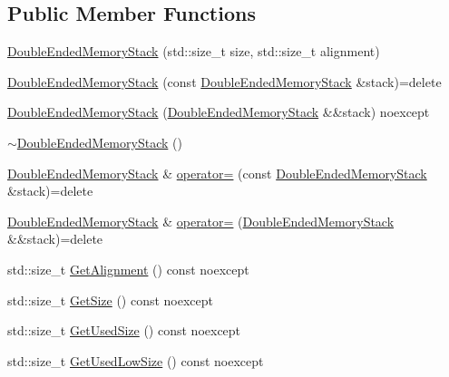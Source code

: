 \subsection*{Public Member Functions}
\begin{DoxyCompactItemize}
\item 
\mbox{\hyperlink{classmage_1_1_double_ended_memory_stack_a6523e21851c5a87e486d342d5e3b64d8}{Double\+Ended\+Memory\+Stack}} (std\+::size\+\_\+t size, std\+::size\+\_\+t alignment)
\item 
\mbox{\hyperlink{classmage_1_1_double_ended_memory_stack_a8a903d4a209929854a6f50cf98e3e2da}{Double\+Ended\+Memory\+Stack}} (const \mbox{\hyperlink{classmage_1_1_double_ended_memory_stack}{Double\+Ended\+Memory\+Stack}} \&stack)=delete
\item 
\mbox{\hyperlink{classmage_1_1_double_ended_memory_stack_a89d83095cc04686b9775fc4a55a5ff30}{Double\+Ended\+Memory\+Stack}} (\mbox{\hyperlink{classmage_1_1_double_ended_memory_stack}{Double\+Ended\+Memory\+Stack}} \&\&stack) noexcept
\item 
\mbox{\hyperlink{classmage_1_1_double_ended_memory_stack_afaac4a28ea1e386bc83d3e07fd5531a0}{$\sim$\+Double\+Ended\+Memory\+Stack}} ()
\item 
\mbox{\hyperlink{classmage_1_1_double_ended_memory_stack}{Double\+Ended\+Memory\+Stack}} \& \mbox{\hyperlink{classmage_1_1_double_ended_memory_stack_aafcc4b3cd8d87d75cc3de53994b6ef7e}{operator=}} (const \mbox{\hyperlink{classmage_1_1_double_ended_memory_stack}{Double\+Ended\+Memory\+Stack}} \&stack)=delete
\item 
\mbox{\hyperlink{classmage_1_1_double_ended_memory_stack}{Double\+Ended\+Memory\+Stack}} \& \mbox{\hyperlink{classmage_1_1_double_ended_memory_stack_a95b220925f1ef732c104901c3f55015d}{operator=}} (\mbox{\hyperlink{classmage_1_1_double_ended_memory_stack}{Double\+Ended\+Memory\+Stack}} \&\&stack)=delete
\item 
std\+::size\+\_\+t \mbox{\hyperlink{classmage_1_1_double_ended_memory_stack_a84d8573c9f565223af48307836b91a95}{Get\+Alignment}} () const noexcept
\item 
std\+::size\+\_\+t \mbox{\hyperlink{classmage_1_1_double_ended_memory_stack_a87ca430feb41c8710855012e87a955c2}{Get\+Size}} () const noexcept
\item 
std\+::size\+\_\+t \mbox{\hyperlink{classmage_1_1_double_ended_memory_stack_afdbfe299c744ef2c363aec40929b6be2}{Get\+Used\+Size}} () const noexcept
\item 
std\+::size\+\_\+t \mbox{\hyperlink{classmage_1_1_double_ended_memory_stack_ad79a70c39eeae4060151219731fec9c9}{Get\+Used\+Low\+Size}} () const noexcept

\end{DoxyCompactItemize}
